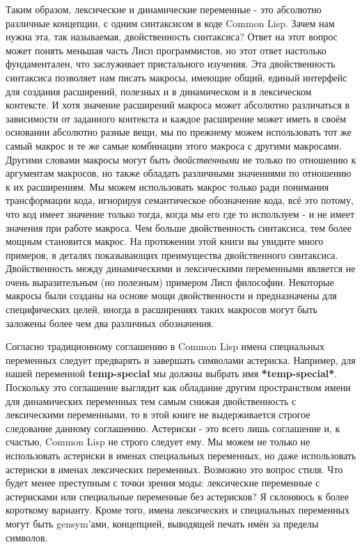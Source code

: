Таким образом, лексические и динамические переменные - это абсолютно различные концепции, с одним синтаксисом в коде Common Lisp. Зачем нам нужна эта, так называемая, двойственность синтаксиса? Ответ на этот вопрос может понять меньшая часть Лисп программистов, но этот ответ настолько фундаментален, что заслуживает пристального изучения. Эта двойственность синтаксиса позволяет нам писать макросы, имеющие общий, единый интерфейс для создания расширений, полезных и в динамическом и в лексическом контексте. И хотя значение расширений макроса может абсолютно различаться в зависимости от заданного контекста и каждое расширение может иметь в своём основании абсолютно разные вещи, мы по прежнему можем использовать тот же самый макрос и те же самые комбинации этого макроса с другими макросами. Другими словами макросы могут быть \emph{двойственными} не только по отношению к аргументам макросов, но также обладать различными значениями по отношению к их расширениям. Мы можем использовать макрос только ради понимания трансформации кода, игнорируя семантическое обозначение кода, всё это потому, что код имеет значение только тогда, когда мы его где то используем - и не имеет значения при работе макроса. Чем больше двойственность синтаксиса, тем более мощным становится макрос. На протяжении этой книги вы увидите много примеров, в деталях показывающих преимущества двойственного синтаксиса. Двойственность между динамическими и лексическими переменными является не очень выразительным (но полезным) примером Лисп философии. Некоторые макросы были созданы на основе мощи двойственности и предназначены для специфических целей, иногда в расширениях таких макросов могут быть заложены более чем два различных обозначения.

Согласно традиционному соглашению в Common Lisp имена специальных переменных следует предварять и завершать символами астериска. Например, для нашей переменной \textbf{temp-special} мы должны выбрать имя \textbf{*temp-special*}. Поскольку это соглашение выглядит как обладание другим пространством имени для динамических переменных тем самым снижая двойственность с лексическими переменными, то в этой книге не выдерживается строгое следование данному соглашению. Астериски - это всего лишь соглашение и, к счастью, Common Lisp не строго следует ему. Мы можем не только не использовать астериски в именах специальных переменных, но даже использовать астериски в именах лексических переменных. Возможно это вопрос стиля. Что будет менее преступным с точки зрения моды: лексические переменные с астерисками или специальные переменные без астерисков? Я склоняюсь к более короткому варианту. Кроме того, имена лексических и специальных переменных могут быть gensym'ами, концепцией, выводящей печать имён за пределы символов.

